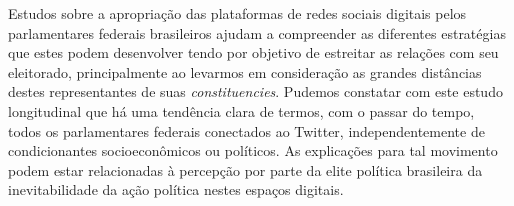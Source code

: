 Estudos sobre a apropriação das plataformas de redes sociais digitais
pelos parlamentares federais brasileiros ajudam a compreender as
diferentes estratégias que estes podem desenvolver tendo por objetivo de
estreitar as relações com seu eleitorado, principalmente ao levarmos em
consideração as grandes distâncias destes representantes de suas
\textit{constituencies}. Pudemos constatar com este estudo longitudinal
que há uma tendência clara de termos, com o passar do tempo, todos os
parlamentares federais conectados ao Twitter, independentemente de
condicionantes socioeconômicos ou políticos. As explicações para tal
movimento podem estar relacionadas à percepção por parte da elite
política brasileira da inevitabilidade da ação política nestes espaços
digitais.



